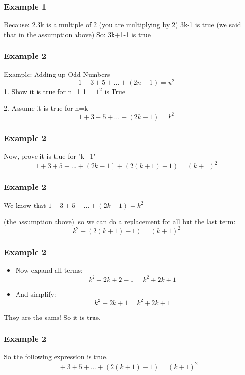 \documentclass{beamer}
\begin{document}
\begin{frame}
\frametitle{Example 1}
\large
Because:
2.3k is a multiple of 2 (you are multiplying by 2)
3k-1 is true (we said that in the assumption above)
So:
3k+1-1 is true

\end{frame}
\begin{frame}
\frametitle{Example 2}
\large
Example: Adding up Odd Numbers
\[1 + 3 + 5 + \ldots + (2n-1) = n^2\]
1. Show it is true for n=1
1 = $1^2$ is True
 
2. Assume it is true for n=k
\[1 + 3 + 5 + \ldots + (2k-1) = k^2\]

\end{frame}
\begin{frame}
\frametitle{Example 2}
\large 
Now, prove it is true for "k+1"
\[ 1 + 3 + 5 + \ldots + (2k-1) + (2(k+1)-1) = (k+1)^2  \]
\end{frame}
\begin{frame}
\frametitle{Example 2}
 
We know that $1 + 3 + 5 + \ldots + (2k-1) = k^2$ 

(the assumption above), so we can do a replacement for all but the last term:
\[k^2 + (2(k+1)-1) = (k+1)^2\]

\end{frame}
\begin{frame}
\frametitle{Example 2}

\begin{itemize}
\item Now expand all terms:
\[ k^2 + 2k + 2 - 1 = k^2 + 2k+1 \]
\item And simplify:
\[ k^2 + 2k + 1 = k^2 + 2k + 1 \]
\end{itemize}
They are the same! So it is true.

\end{frame}
\begin{frame}
\frametitle{Example 2}

So the following expression is true. 
\[ 1 + 3 + 5 + \ldots + (2(k+1)-1) = (k+1)^2 \]
\end{frame}
\end{document}
